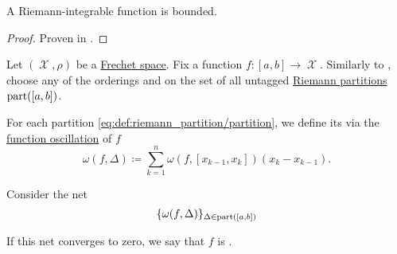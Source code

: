 \begin{corollary}\label{thm:riemann_integrable_implies_bounded}
  A Riemann-integrable function is bounded.
\end{corollary}
\begin{proof}
  Proven in .
\end{proof}

\begin{definition}\label{def:darboux_integrability}\mcite\cite[def. 17]{Gordon1991}
  Let \( (\mscrX, \rho) \) be a \hyperref[def:frechet_space]{Frechet space}. Fix a function \( f: [a, b] \to \mscrX \). Similarly to , choose any of the orderings  and  on the set of all untagged \hyperref[def:riemann_partition/partition]{Riemann partitions} \( \operatorname{part}([a, b]) \).

  For each partition \eqref{eq:def:riemann_partition/partition}, we define its  via the \hyperref[def:function_oscillation]{function oscillation} of \( f \)
  \begin{equation}\label{eq:def:darboux_integrability/oscillation}
    \omega(f, \Delta) \coloneqq \sum_{k=1}^n \omega(f, [x_{k-1}, x_k]) (x_k - x_{k-1}).
  \end{equation}

  Consider the net
  \begin{equation}\label{eq:def:darboux_integrability/net}
    \{ \omega(f, \Delta) \}_{\Delta \in \operatorname{part}([a, b])}
  \end{equation}

  If this net converges to zero, we say that \( f \) is .
\end{definition}

